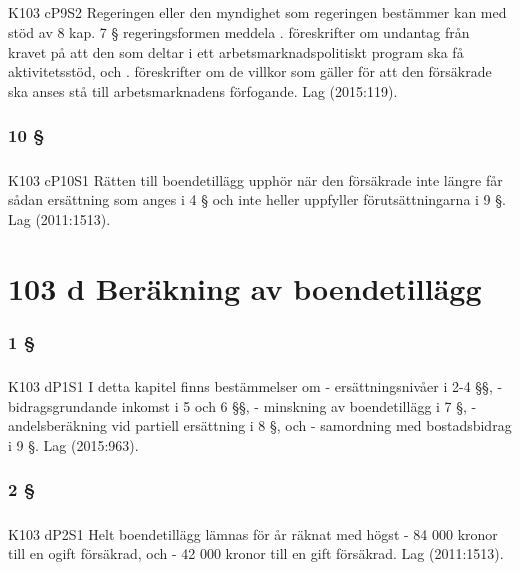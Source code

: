 \documentclass[a4paper,notitlepage,openany,10pt]{book}
\begin{document}
\paragraph*{}
{\tiny K103 cP9S2}
Regeringen eller den myndighet som regeringen bestämmer kan med stöd av 8 kap. 7 § regeringsformen meddela
. föreskrifter om undantag från kravet på att den som deltar i ett arbetsmarknadspolitiskt program ska få aktivitetsstöd, och
. föreskrifter om de villkor som gäller för att den försäkrade ska anses stå till arbetsmarknadens förfogande.
Lag (2015:119).
\subsection*{10 §}
\paragraph*{}
{\tiny K103 cP10S1}
Rätten till boendetillägg upphör när den försäkrade inte längre får sådan ersättning som anges i 4 § och inte heller uppfyller förutsättningarna i 9 §.
Lag (2011:1513).
\chapter*{103 d Beräkning av boendetillägg}
\subsection*{1 §}
\paragraph*{}
{\tiny K103 dP1S1}
I detta kapitel finns bestämmelser om
\newline - ersättningsnivåer i 2-4 §§,
\newline - bidragsgrundande inkomst i 5 och 6 §§,
\newline - minskning av boendetillägg i 7 §,
\newline - andelsberäkning vid partiell ersättning i 8 §, och
\newline - samordning med bostadsbidrag i 9 §.
Lag (2015:963).
\subsection*{2 §}
\paragraph*{}
{\tiny K103 dP2S1}
Helt boendetillägg lämnas för år räknat med högst
\newline - 84 000 kronor till en ogift försäkrad, och
\newline - 42 000 kronor till en gift försäkrad.
Lag (2011:1513).
\end{document}
